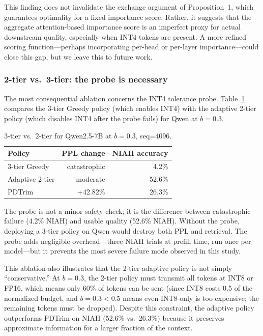 \documentclass[11pt]{article}
\newcommand{\budget}{b}
\newcommand{\pct}{\%}
\theoremstyle{plain}
\theoremstyle{definition}
\begin{document}
This finding does not invalidate the exchange argument of Proposition~1, which guarantees optimality for a fixed importance score.  Rather, it suggests that the aggregate attention-based importance score is an imperfect proxy for actual downstream quality, especially when INT4 tokens are present.  A more refined scoring function---perhaps incorporating per-head or per-layer importance---could close this gap, but we leave this to future work.

\subsubsection{2-tier vs.\ 3-tier: the probe is necessary}
\label{sec:ablation-probe}

The most consequential ablation concerns the INT4 tolerance probe.  Table~\ref{tab:ablation-probe} compares the 3-tier Greedy policy (which enables INT4) with the adaptive 2-tier policy (which disables INT4 after the probe fails) for Qwen at $\budget=0.3$.

\begin{table}[t]
\centering
\caption{3-tier vs.\ 2-tier for Qwen2.5-7B at $\budget=0.3$, seq=4096.}
\label{tab:ablation-probe}
\small
\begin{tabular}{lrr}
\toprule
Policy & PPL change & NIAH accuracy \\
\midrule
3-tier Greedy & catastrophic & 4.2\pct{} \\
Adaptive 2-tier & moderate & 52.6\pct{} \\
PDTrim & +42.82\pct{} & 26.3\pct{} \\
\bottomrule
\end{tabular}
\end{table}

The probe is not a minor safety check; it is the difference between catastrophic failure (4.2\pct{} NIAH) and usable quality (52.6\pct{} NIAH).  Without the probe, deploying a 3-tier policy on Qwen would destroy both PPL and retrieval.  The probe adds negligible overhead---three NIAH trials at prefill time, run once per model---but it prevents the most severe failure mode observed in this study.

This ablation also illustrates that the 2-tier adaptive policy is not simply ``conservative.''  At $\budget=0.3$, the 2-tier policy must transmit all tokens at INT8 or FP16, which means only 60\pct{} of tokens can be sent (since INT8 costs 0.5 of the normalized budget, and $\budget=0.3 < 0.5$ means even INT8-only is too expensive; the remaining tokens must be dropped).  Despite this constraint, the adaptive policy outperforms PDTrim on NIAH (52.6\pct{} vs.\ 26.3\pct{}) because it preserves approximate information for a larger fraction of the context.
\end{document}
